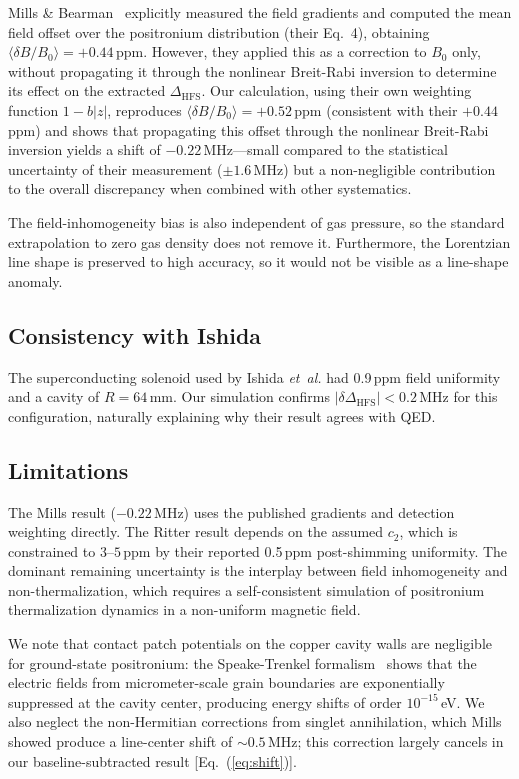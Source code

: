 \documentclass[twocolumn,pra,aps,superscriptaddress,floatfix,10pt]{revtex4-2}
\begin{document}
Mills \& Bearman~\cite{Mills1975} explicitly measured the field gradients and computed the mean field offset over the positronium distribution (their Eq.~4), obtaining $\langle\delta B/B_0\rangle = +0.44$\,ppm. However, they applied this as a correction to $B_0$ only, without propagating it through the nonlinear Breit-Rabi inversion to determine its effect on the extracted $\Delta_\mathrm{HFS}$. Our calculation, using their own weighting function $1 - b|z|$, reproduces $\langle\delta B/B_0\rangle = +0.52$\,ppm (consistent with their $+0.44$\,ppm) and shows that propagating this offset through the nonlinear Breit-Rabi inversion yields a shift of $-0.22$\,MHz---small compared to the statistical uncertainty of their measurement ($\pm 1.6$\,MHz) but a non-negligible contribution to the overall discrepancy when combined with other systematics.

The field-inhomogeneity bias is also independent of gas pressure, so the standard extrapolation to zero gas density does not remove it. Furthermore, the Lorentzian line shape is preserved to high accuracy, so it would not be visible as a line-shape anomaly.

\subsection{Consistency with Ishida}

The superconducting solenoid used by Ishida \textit{et~al.} had 0.9\,ppm field uniformity and a cavity of $R = 64$\,mm. Our simulation confirms $|\delta\Delta_\mathrm{HFS}| < 0.2$\,MHz for this configuration, naturally explaining why their result agrees with QED.

\subsection{Limitations}

The Mills result ($-0.22$\,MHz) uses the published gradients and detection weighting directly. The Ritter result depends on the assumed $c_2$, which is constrained to $3$--$5$\,ppm by their reported 0.5\,ppm post-shimming uniformity. The dominant remaining uncertainty is the interplay between field inhomogeneity and non-thermalization, which requires a self-consistent simulation of positronium thermalization dynamics in a non-uniform magnetic field.

We note that contact patch potentials on the copper cavity walls are negligible for ground-state positronium: the Speake-Trenkel formalism~\cite{Speake2003} shows that the electric fields from micrometer-scale grain boundaries are exponentially suppressed at the cavity center, producing energy shifts of order $10^{-15}$\,eV. We also neglect the non-Hermitian corrections from singlet annihilation, which Mills~\cite{Mills1983} showed produce a line-center shift of $\sim 0.5$\,MHz; this correction largely cancels in our baseline-subtracted result [Eq.~(\ref{eq:shift})].
\end{document}
